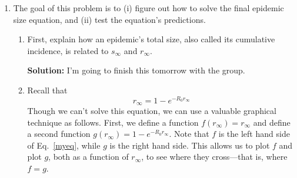 \documentclass[11pt]{article}
\newenvironment{solution}{\par\noindent\begingroup\color{BrickRed}\textbf{Solution:} }{\par\endgroup}
\begin{document}
\begin{enumerate}
\begin{enumerate}[label=\alph*.]
	\item Use your results to explain how the recovery rate $\gamma$ is related to the typical amount of time a person remains infectious.
		\begin{solution} \newline \newline
			If $E[X] = \frac{1}{\gamma}$ can be used to model the typical amount of time a person stays infected for,
			then $\gamma$ must be the inverse of the expected duration of infection. \\
			Assuming that time steps are measured in days, \\
			if $\gamma$ is say $2$, then the expected duration of infection is just half of a day. \\
			Conversely, if $\gamma$ is $0.5$, then the expected duration of infection is $2$ whole days. \\
			So the larger the recovery rate $\gamma$, the shorter the expected duration of infection. \\
			This is somewhat intuitive.
		\end{solution}
\end{enumerate}

\clearpage

\item The goal of this problem is to 
	  (i) figure out how to solve the final epidemic size equation, and 
	  (ii) test the equation's predictions.

	\begin{enumerate}[label=\alph*.]
		\item First, explain how an epidemic's total size, also called its cumulative incidence, is related to $s_\infty$ and $r_\infty$. 
			\begin{solution} \newline \newline
				I'm going to finish this tomorrow with the group. \\
			\end{solution}
		\item Recall that 
		\begin{equation}r_\infty = 1-e^{-R_0 r_\infty}\label{myeq}\end{equation} 
		Though we can't solve this equation, we can use a valuable graphical technique as follows. 
		First, we define a function $f(r_\infty) = r_\infty$ and define a second function $g(r_\infty) = 1-e^{-R_0 r_\infty}$. 
		Note that $f$ is the left hand side of Eq.~\eqref{myeq}, while $g$ is the right hand side. 
		This allows us to plot $f$ and plot $g$, both as a function of $r_\infty$, to see where they cross---that is, where $f=g$. 
		

\end{enumerate}
\end{enumerate}
\end{document}
